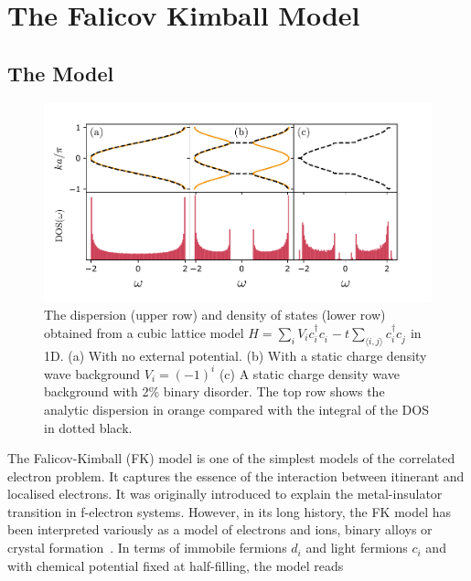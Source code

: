 \hypertarget{the-falicov-kimball-model}{%
\section{The Falicov Kimball Model}\label{the-falicov-kimball-model}}

\hypertarget{the-model}{%
\subsection{The Model}\label{the-model}}

\hypertarget{fig:simple_DOS}{%
\begin{figure}
\centering
\includegraphics[width=1\textwidth,height=\textheight]{figure_code/background_chapter/simple_DOS}
\caption[{Cubic Lattice dispersion with disorder}]{The dispersion (upper row) and density of states (lower row) obtained from a cubic lattice model \(H = \sum_{i} V_i c^\dagger_{i}c^{\phantom{\dagger}}_{i} - t \sum_{\langle i,j\rangle} c^\dagger_{i}c^{\phantom{\dagger}}_{j}\) in 1D. (a) With no external potential. (b) With a static charge density wave background \(V_i = (-1)^i\) (c) A static charge density wave background with 2\% binary disorder. The top row shows the analytic dispersion in orange compared with the integral of the DOS in dotted black.}
\label{fig:simple_DOS}
\end{figure}
}

The Falicov-Kimball (FK) model is one of the simplest models of the correlated electron problem. It captures the essence of the interaction between itinerant and localised electrons. It was originally introduced to explain the metal-insulator transition in f-electron systems. However, in its long history, the FK model has been interpreted variously as a model of electrons and ions, binary alloys or crystal formation~\autocite{hubbardj.ElectronCorrelationsNarrow1963,falicovSimpleModelSemiconductorMetal1969,gruberFalicovKimballModelReview1996,gruberFalicovKimballModel2006}. In terms of immobile fermions \(d_i\) and light fermions \(c_i\) and with chemical potential fixed at half-filling, the model reads

